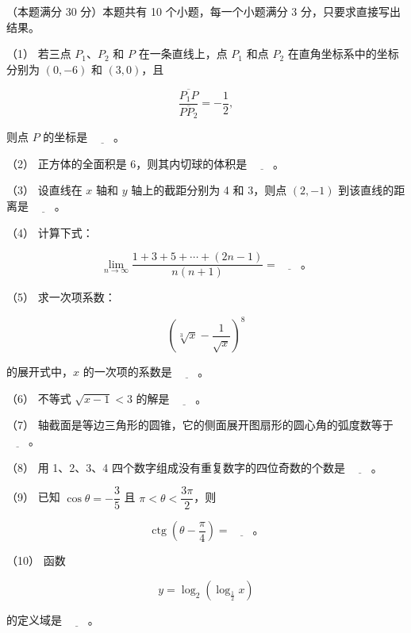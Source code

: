 \begin{question}
（本题满分 30 分）本题共有 10 个小题，每一个小题满分 3 分，只要求直接写出结果。

（1） 若三点 $P_1\text{、}P_2$ 和 $P$ 在一条直线上，点 $P_1$ 和点 $P_2$ 在直角坐标系中的坐标分别为 $(0,-6)$ 和 $(3,0)$，且

\nopagebreak[4]
\[
\frac{\overline{P_1P}}{\overline{PP_2}}=-\frac12,
\]

则点 $P$ 的坐标是 $\underline{\hspace{2em}}$。

（2） 正方体的全面积是 6，则其内切球的体积是 $\underline{\hspace{2em}}$。

（3） 设直线在 $x$ 轴和 $y$ 轴上的截距分别为 4 和 3，则点 $(2,-1)$ 到该直线的距离是 $\underline{\hspace{2em}}$。

（4） 计算下式：

\nopagebreak[4]
\[
\lim_{n\to\infty}\frac{1+3+5+\cdots+(2n-1)}{n(n+1)}
=\underline{\hspace{2em}}\text{。}
\]

（5） 求一次项系数：

\nopagebreak[4]
\[
\left(\sqrt[3]{x}-\frac1{\sqrt{x}}\right)^8
\]

的展开式中，$x$ 的一次项的系数是 $\underline{\hspace{2em}}$。

（6） 不等式 $\sqrt{x-1}<3$ 的解是 $\underline{\hspace{2em}}$。

（7） 轴截面是等边三角形的圆锥，它的侧面展开图扇形的圆心角的弧度数等于 $\underline{\hspace{2em}}$。

（8） 用 1、2、3、4 四个数字组成没有重复数字的四位奇数的个数是 $\underline{\hspace{2em}}$。

（9） 已知 $\cos\theta=-\dfrac35$ 且 $\pi<\theta<\dfrac{3\pi}2$，则

\nopagebreak[4]
\[
\operatorname{ctg}\left(\theta-\frac\pi4\right)=\underline{\hspace{2em}}\text{。}
\]

（10） 函数

\nopagebreak[4]
\[
y=\log_2\left(\log_{\frac12}x\right)
\]

的定义域是 $\underline{\hspace{2em}}$。

\end{question}
